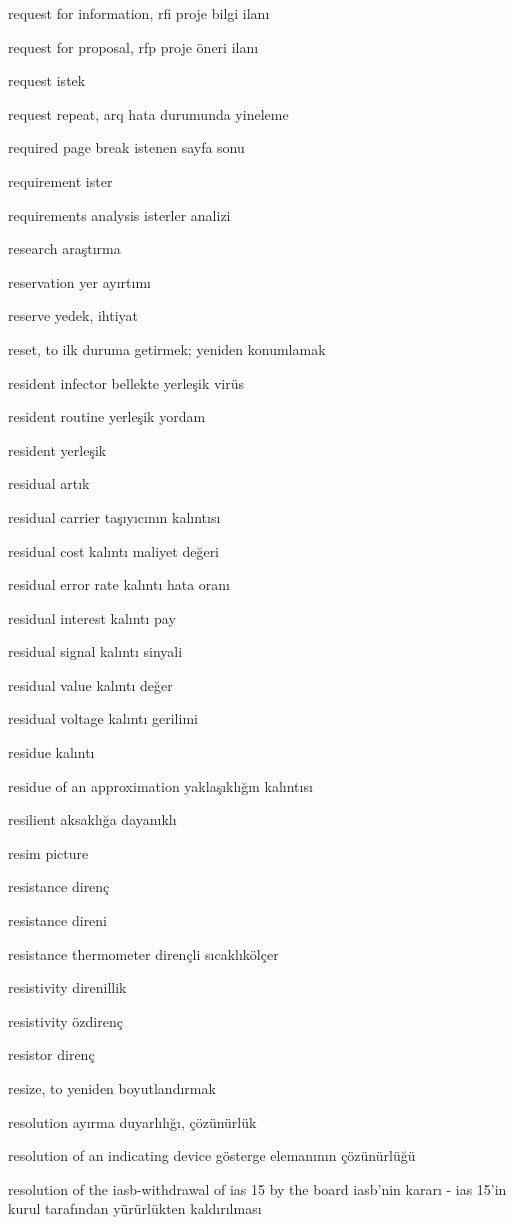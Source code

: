 \documentclass[12pt,fleqn]{article}\usepackage{../../common}
\begin{document}
request for information, rfi proje bilgi ilanı

request for proposal, rfp proje öneri ilanı

request istek

request repeat, arq hata durumunda yineleme

required page break istenen sayfa sonu

requirement ister

requirements analysis isterler analizi

research araştırma

reservation yer ayırtımı

reserve yedek, ihtiyat

reset, to ilk duruma getirmek; yeniden konumlamak

resident infector bellekte yerleşik virüs

resident routine yerleşik yordam

resident yerleşik

residual artık

residual carrier taşıyıcının kalıntısı

residual cost kalıntı maliyet değeri

residual error rate kalıntı hata oranı

residual interest kalıntı pay

residual signal kalıntı sinyali

residual value kalıntı değer

residual voltage kalıntı gerilimi

residue kalıntı

residue of an approximation yaklaşıklığın kalıntısı

resilient aksaklığa dayanıklı

resim picture

resistance direnç

resistance direni

resistance thermometer dirençli sıcaklıkölçer

resistivity direnillik

resistivity özdirenç

resistor direnç

resize, to yeniden boyutlandırmak

resolution ayırma duyarlılığı, çözünürlük

resolution of an indicating device gösterge elemanının çözünürlüğü

resolution of the iasb-withdrawal of ias 15 by the board iasb'nin kararı - ias 15'in kurul tarafından yürürlükten kaldırılması
\end{document}
